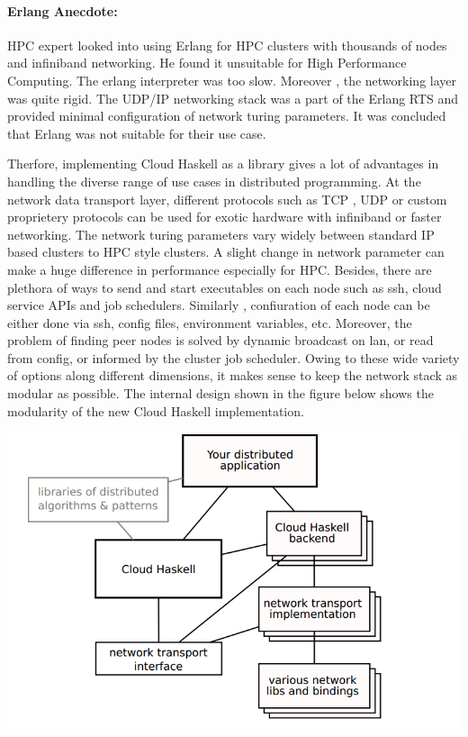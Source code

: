 \documentclass[twoside]{article}
\begin{document}
\paragraph{Erlang Anecdote:}
HPC expert looked into using Erlang for HPC clusters with thousands of
nodes and infiniband networking. He found it unsuitable for High
Performance Computing. The erlang interpreter was too slow. Moreover ,
the networking layer was quite rigid. The UDP/IP networking stack was
a part of the Erlang RTS and provided minimal configuration of network
turing parameters. It was concluded that Erlang was not suitable for
their use case.

Therfore, implementing Cloud Haskell as a library gives a lot of
advantages in handling the diverse range of use cases in distributed
programming. At the network data transport layer, different protocols
such as TCP , UDP or custom proprietery protocols can be used for
exotic hardware with infiniband or faster networking. The network
turing parameters vary widely between standard IP based clusters to
HPC style clusters. A slight change in network parameter can make a
huge difference in performance especially for HPC. Besides, there are
plethora of ways to send and start executables on each node such as
ssh, cloud service APIs and job schedulers. Similarly , confiuration
of each node can be either done via ssh, config files, environment
variables, etc. Moreover, the problem of finding peer nodes is solved
by dynamic broadcast on lan, or read from config, or informed by the
cluster job scheduler. Owing to these wide variety of options along
different dimensions, it makes sense to keep the network stack as
modular as possible. The internal design shown in the figure below
shows the modularity of the new Cloud Haskell implementation.

\includegraphics[width=\linewidth]{design}
\end{document}
